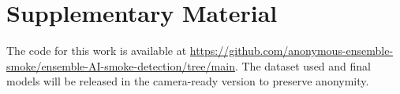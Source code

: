 \documentclass{article}
\begin{document}
\section{Supplementary Material}
The code for this work is available at \url{https://github.com/anonymous-ensemble-smoke/ensemble-AI-smoke-detection/tree/main}. The dataset used and final models will be released in the camera-ready version to preserve anonymity.
\end{document}
